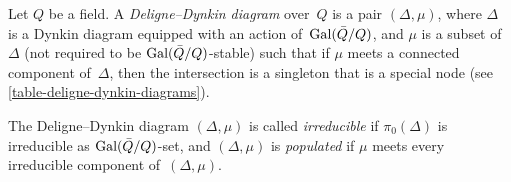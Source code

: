 \documentclass[10pt,twoside,leqno]{article}
\numberwithin{equation}{subsection}
\newcommand{\Gal}{\textnormal{Gal}}
\begin{document}
\begin{definition} %
 \label{deligne-dynkin-diagram}
 Let $Q$ be a field.
 A \emph{Deligne--Dynkin diagram} over~$Q$ is a pair $(\Delta, \mu)$, where
 $\Delta$ is a Dynkin diagram equipped with an action of~$\Gal(\bar Q/Q)$,
 and $\mu$ is a subset of~$\Delta$
 (not required to be $\Gal(\bar Q/Q)$-stable)
 such that if $\mu$ meets a connected component of~$\Delta$,
 then the intersection is a singleton that is a special node
 (see \cref{table-deligne-dynkin-diagrams}).
 
 The Deligne--Dynkin diagram $(\Delta,\mu)$ is called \emph{irreducible}
 if $\pi_0(\Delta)$ is irreducible as $\Gal(\bar Q/Q)$-set,
 and $(\Delta,\mu)$ is \emph{populated} if $\mu$ meets every
 irreducible component of~$(\Delta,\mu)$.
\end{definition}
\end{document}
